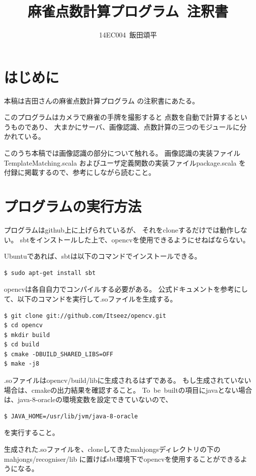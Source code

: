 \documentclass{jsarticle}
\title{麻雀点数計算プログラム\ 注釈書}
\author{14EC004\ 飯田頌平}
\begin{document}
\maketitle

\begin{multicols}{2}

\section{はじめに}
本稿は吉田さんの麻雀点数計算プログラム\cite{yoshida}
の注釈書にあたる。

このプログラムはカメラで麻雀の手牌を撮影すると
点数を自動で計算するというものであり、
大まかにサーバ、画像認識、点数計算の三つのモジュールに分かれている。

このうち本稿では画像認識の部分について触れる。
画像認識の実装ファイルTemplateMatching.scala
およびユーザ定義関数の実装ファイルpackage.scala
を付録に掲載するので、参考にしながら読むこと。

\section{プログラムの実行方法}

プログラムはgithub上に上げられているが、
それをcloneするだけでは動作しない。
sbtをインストールした上で、opencvを使用できるようにせねばならない。

Ubuntuであれば、sbtは以下のコマンドでインストールできる。
\begin{lstlisting}[caption=sbt,label=sbt]
$ sudo apt-get install sbt
\end{lstlisting}

opencvは各自自力でコンパイルする必要がある。
公式ドキュメントを参考にして、以下のコマンドを実行して.soファイルを生成する。
\begin{lstlisting}[caption=opencv,label=opencv]
$ git clone git://github.com/Itseez/opencv.git
$ cd opencv
$ mkdir build
$ cd build
$ cmake -DBUILD_SHARED_LIBS=OFF
$ make -j8
\end{lstlisting}

.soファイルはopencv/build/libに生成されるはずである。
もし生成されていない場合は、cmakeの出力結果を確認すること。
To\ be\ builtの項目にjavaとない場合は、java-8-oracleの環境変数を設定できていないので、
\begin{lstlisting}[caption=JAVAHOME,label=j]
$ JAVA_HOME=/usr/lib/jvm/java-8-oracle
\end{lstlisting}
を実行すること。

生成された.soファイルを、cloneしてきたmahjongsディレクトリの下の
mahjongs/recogniser/lib
に置けばsbt環境下でopencvを使用することができるようになる。


\end{multicols}
\end{document}

